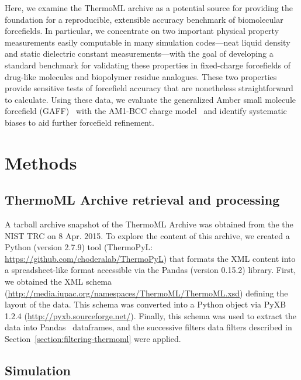 \documentclass[aps,pre,twocolumn,nofootinbib,superscriptaddress,linenumbers]{revtex4-1}
\begin{document}
Here, we examine the ThermoML archive as a potential source for providing the foundation for a reproducible, extensible accuracy benchmark of biomolecular forcefields.
In particular, we concentrate on two important physical property measurements easily computable in many simulation codes---neat liquid density and static dielectric constant measurements---with the goal of developing a standard benchmark for validating these properties in fixed-charge forcefields of drug-like molecules and biopolymer residue analogues.  
These two properties provide sensitive tests of forcefield accuracy that are nonetheless straightforward to calculate.  
Using these data, we evaluate the generalized Amber small molecule forcefield (GAFF)~\cite{gaff,gaff2} with the AM1-BCC charge model~\cite{am1bcc1,am1bcc2} and identify systematic biases to aid further forcefield refinement.





\section{Methods}
\label{section:methods}

\subsection{ThermoML Archive retrieval and processing}
\label{section:thermoml-archive-retrieval}

A tarball archive snapshot of the ThermoML Archive was obtained from the the NIST TRC on 8 Apr. 2015.
To explore the content of this archive, we created a Python (version 2.7.9) tool (ThermoPyL: \url{https://github.com/choderalab/ThermoPyL}) that formats the XML content into a spreadsheet-like format accessible via the Pandas (version 0.15.2) library.  
First, we obtained the XML schema (\url{http://media.iupac.org/namespaces/ThermoML/ThermoML.xsd}) defining the layout of the data.
This schema was converted into a Python object via PyXB 1.2.4 (\url{http://pyxb.sourceforge.net/}).
Finally, this schema was used to extract the data into Pandas~\cite{pandas} dataframes, and the successive filters data filters described in Section~\ref{section:filtering-thermoml} were applied.  

\subsection{Simulation}
\label{section:simulation}
\end{document}
